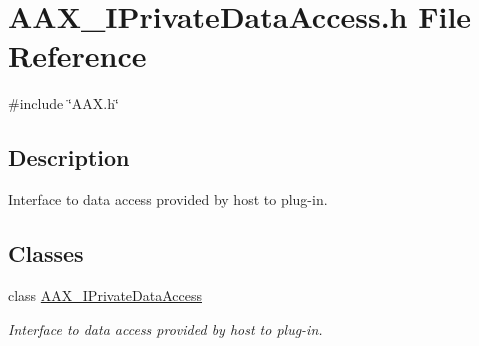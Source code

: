 \hypertarget{a00629}{}\section{A\+A\+X\+\_\+\+I\+Private\+Data\+Access.\+h File Reference}
\label{a00629}
{\ttfamily \#include \char`\"{}A\+A\+X.\+h\char`\"{}}\newline


\subsection{Description}
Interface to data access provided by host to plug-\/in. 

\subsection*{Classes}
\begin{DoxyCompactItemize}
\item 
class \mbox{\hyperlink{a01865}{A\+A\+X\+\_\+\+I\+Private\+Data\+Access}}
\begin{DoxyCompactList}\small\item\em Interface to data access provided by host to plug-\/in. \end{DoxyCompactList}\end{DoxyCompactItemize}
